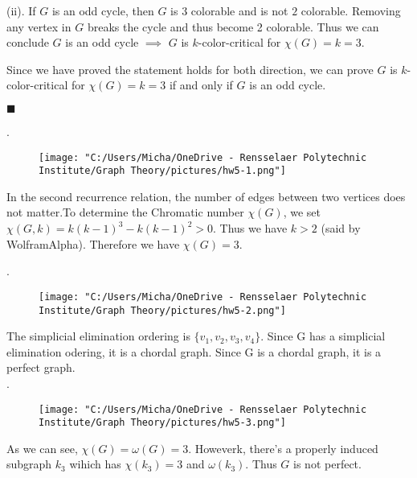 \documentclass[12pt]{article}
\begin{document}
	(ii). If $G$ is an odd cycle, then $G$ is $3$ colorable and is not $2$ colorable. Removing any vertex in $G$ breaks the cycle and thus become 2 colorable. Thus we can conclude $G$ is an odd cycle $\implies$ $G$ is $k$-color-critical for $\chi(G) = k = 3$.
	
	Since we have proved the statement holds for both direction, we can prove  $G$ is $k$-color-critical for $\chi(G) = k = 3$ if and only if $G$ is an odd cycle.
	
		\hfill $\blacksquare$
		
	\newpage
	
	.
	
	\begin{figure}[h]
		\texttt{[image: "C:/Users/Micha/OneDrive - Rensselaer Polytechnic Institute/Graph Theory/pictures/hw5-1.png"]}\\
	\end{figure}
	In the second recurrence relation, the number of edges between two vertices does not matter.To determine the Chromatic number $\chi(G)$, we set $\chi(G,k) = k(k-1)^3-k(k-1)^2 > 0$. Thus we have $k>2$ (said by WolframAlpha). Therefore we have $\chi(G) = 3$.
	
	.
	
	\begin{figure}[h]
		\texttt{[image: "C:/Users/Micha/OneDrive - Rensselaer Polytechnic Institute/Graph Theory/pictures/hw5-2.png"]}\\
	\end{figure}
	The simplicial elimination ordering is $\{v_1,v_2,v_3,v_4\}$. Since G has a simplicial elimination odering, it is a chordal graph. Since G is a chordal graph, it is a perfect graph.\\
	\newpage
	.
		\begin{figure}[h]
		\texttt{[image: "C:/Users/Micha/OneDrive - Rensselaer Polytechnic Institute/Graph Theory/pictures/hw5-3.png"]}\\
	\end{figure}

	As we can see, $\chi(G)= \omega(G) = 3$. Howeverk, there's a properly induced subgraph $k_3$ wihich has $\chi(k_3) = 3$ and $\omega(k_3)$. Thus $G$ is not perfect.
\end{document}
